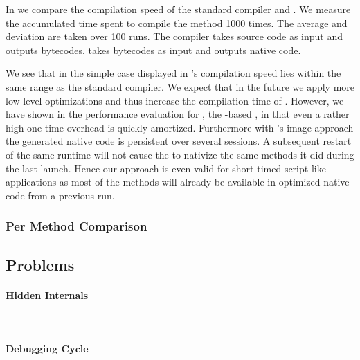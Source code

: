 \noindent In  we compare the compilation speed of the standard \PH compiler and \NBJ.
We measure the accumulated time spent to compile the method 1000 times.
The average and deviation are taken over 100 runs. 
The \PH compiler takes source code as input and outputs \ST bytecodes.
\NBJ takes bytecodes as input and outputs native code.

We see that in the simple case displayed in  \NBJ's compilation speed lies within the same range as the standard \ST compiler.
We expect that in the future we apply more low-level optimizations and thus increase the compilation time of \NBJ.
However, we have shown in the performance evaluation for \NB, the \B-based \FFI, in  that even a rather high one-time overhead is quickly amortized.
Furthermore with \ST's image approach the generated native code is persistent over several sessions.
A subsequent restart of the same runtime will not cause the \JIT to nativize the same methods it did during the last launch.
Hence our approach is even valid for short-timed script-like applications as most of the methods will already be available in optimized native code from a previous run.

\subsubsection*{Per Method Comparison}


\subsection{Problems}
\paragraph{Hidden \VM Internals}
\\


\paragraph{Debugging Cycle}
 \\
 \\

